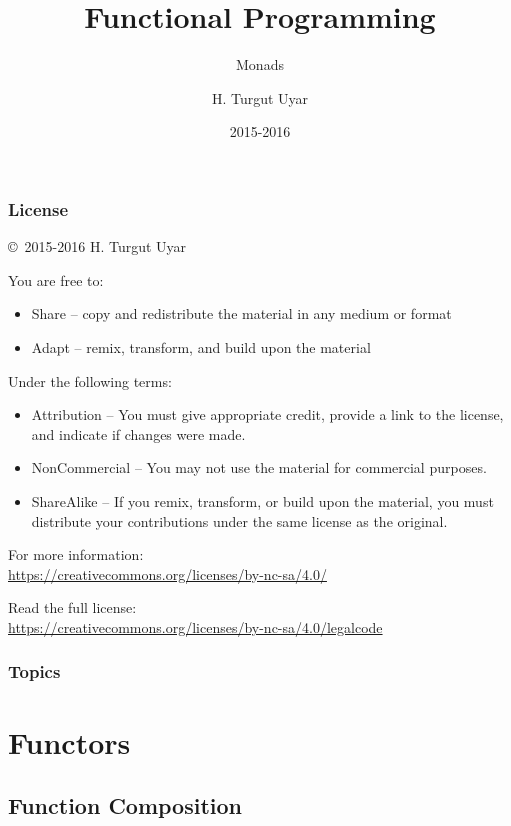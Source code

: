 \documentclass[dvipsnames]{beamer}
\title{Functional Programming}
\subtitle{Monads}
\author{H. Turgut Uyar}
\date{2015-2016}
\theoremstyle{plain}
\begin{document}
\begin{frame}
  \titlepage
\end{frame}

\begin{frame}
  \frametitle{License}

  \hfill
  \copyright~2015-2016 H. Turgut Uyar

  \vfill
  \begin{footnotesize}
    You are free to:
    \begin{itemize}
      \itemsep0em
      \item Share -- copy and redistribute the material in any medium or format
      \item Adapt -- remix, transform, and build upon the material
    \end{itemize}

    Under the following terms:
    \begin{itemize}
      \itemsep0em
      \item Attribution -- You must give appropriate credit, provide a link to
        the license, and indicate if changes were made.

      \item NonCommercial -- You may not use the material for commercial
        purposes.

      \item ShareAlike -- If you remix, transform, or build upon the material,
        you must distribute your contributions under the same license as the
        original.
    \end{itemize}

    For more information:\\
    \url{https://creativecommons.org/licenses/by-nc-sa/4.0/}

    \smallskip
    Read the full license:\\
    \url{https://creativecommons.org/licenses/by-nc-sa/4.0/legalcode}
  \end{footnotesize}
\end{frame}

\begin{frame}
  \frametitle{Topics}
  \tableofcontents
\end{frame}

\section{Functors}

\subsection{Function Composition}
\end{document}
